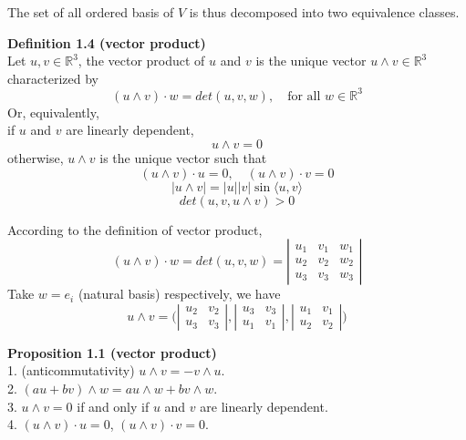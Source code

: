\documentclass{article}
\begin{document}
\par
The set of all ordered basis of $V$ is thus decomposed into two equivalence classes.

\par
\textbf{Definition 1.4 (vector product)}\\
Let $u, v \in \mathbb{R}^3$, the vector product of $u$ and $v$ is the unique vector $u \wedge v \in \mathbb{R}^3$
characterized by
$$
    (u \wedge v) \cdot w = det(u, v, w), \quad \text{for all }w \in \mathbb{R}^3
$$
Or, equivalently,\\
if $u$ and $v$ are linearly dependent,
$$
    u \wedge v = 0
$$
otherwise, $u \wedge v$ is the unique vector such that
$$
    (u \wedge v) \cdot u = 0,\quad(u \wedge v) \cdot v = 0
$$
$$
    |u \wedge v| = |u||v|\sin \langle u, v \rangle
$$
$$
    det(u, v, u \wedge v) > 0
$$

\par
According to the definition of vector product,
$$
    (u \wedge v) \cdot w = det(u, v, w) = 
    \left|\begin{array}{ccc} 
            u_1 & v_1 & w_1 \\ 
            u_2 & v_2 & w_2\\ 
            u_3 & v_3 & w_3
    \end{array}\right|
$$
Take $w = e_i$ (natural basis) respectively, we have
$$
    u \wedge v = \Biggl(
    \left|\begin{array}{cc} 
        u_2 & v_2 \\ 
        u_3 & v_3
    \end{array}\right|,
    \left|\begin{array}{cc} 
        u_3 & v_3 \\ 
        u_1 & v_1
    \end{array}\right|,
    \left|\begin{array}{cc} 
        u_1 & v_1 \\ 
        u_2 & v_2
    \end{array}\right|
    \Biggr)
$$

\par
\textbf{Proposition 1.1 (vector product)}\\
1. (anticommutativity) $u \wedge v = - v \wedge u$.\\
2. $(au + bv) \wedge w = au \wedge w + bv \wedge w$.\\
3. $u \wedge v = 0$ if and only if $u$ and $v$ are linearly dependent.\\
4. $(u \wedge v) \cdot u = 0$, $(u \wedge v) \cdot v = 0$.\\
\end{document}
